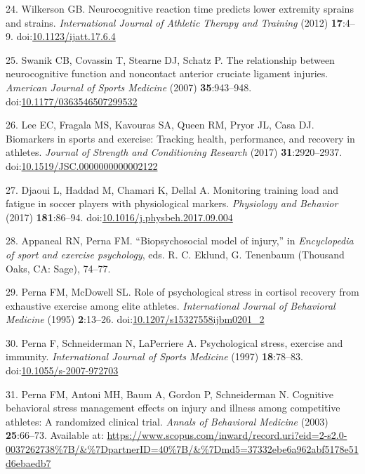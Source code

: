 \documentclass[
  english,
  man]{apa6}
\newenvironment{cslreferences}%
  {}%
  {\par}
\begin{document}
\begin{cslreferences}
\leavevmode\hypertarget{ref-Wilkerson2012a}{}%
24. Wilkerson GB. Neurocognitive reaction time predicts lower extremity sprains and strains. \emph{International Journal of Athletic Therapy and Training} (2012) \textbf{17}:4--9. doi:\href{https://doi.org/10.1123/ijatt.17.6.4}{10.1123/ijatt.17.6.4}

\leavevmode\hypertarget{ref-Swanik2007}{}%
25. Swanik CB, Covassin T, Stearne DJ, Schatz P. The relationship between neurocognitive function and noncontact anterior cruciate ligament injuries. \emph{American Journal of Sports Medicine} (2007) \textbf{35}:943--948. doi:\href{https://doi.org/10.1177/0363546507299532}{10.1177/0363546507299532}

\leavevmode\hypertarget{ref-Lee2017}{}%
26. Lee EC, Fragala MS, Kavouras SA, Queen RM, Pryor JL, Casa DJ. Biomarkers in sports and exercise: Tracking health, performance, and recovery in athletes. \emph{Journal of Strength and Conditioning Research} (2017) \textbf{31}:2920--2937. doi:\href{https://doi.org/10.1519/JSC.0000000000002122}{10.1519/JSC.0000000000002122}

\leavevmode\hypertarget{ref-Djaoui2017}{}%
27. Djaoui L, Haddad M, Chamari K, Dellal A. Monitoring training load and fatigue in soccer players with physiological markers. \emph{Physiology and Behavior} (2017) \textbf{181}:86--94. doi:\href{https://doi.org/10.1016/j.physbeh.2017.09.004}{10.1016/j.physbeh.2017.09.004}

\leavevmode\hypertarget{ref-Appaneal2014}{}%
28. Appaneal RN, Perna FM. ``Biopsychosocial model of injury,'' in \emph{Encyclopedia of sport and exercise psychology}, eds. R. C. Eklund, G. Tenenbaum (Thousand Oaks, CA: Sage), 74--77.

\leavevmode\hypertarget{ref-Perna1995}{}%
29. Perna FM, McDowell SL. Role of psychological stress in cortisol recovery from exhaustive exercise among elite athletes. \emph{International Journal of Behavioral Medicine} (1995) \textbf{2}:13--26. doi:\href{https://doi.org/10.1207/s15327558ijbm0201_2}{10.1207/s15327558ijbm0201\_2}

\leavevmode\hypertarget{ref-Perna1997}{}%
30. Perna F, Schneiderman N, LaPerriere A. Psychological stress, exercise and immunity. \emph{International Journal of Sports Medicine} (1997) \textbf{18}:78--83. doi:\href{https://doi.org/10.1055/s-2007-972703}{10.1055/s-2007-972703}

\leavevmode\hypertarget{ref-Perna2003}{}%
31. Perna FM, Antoni MH, Baum A, Gordon P, Schneiderman N. Cognitive behavioral stress management effects on injury and illness among competitive athletes: A randomized clinical trial. \emph{Annals of Behavioral Medicine} (2003) \textbf{25}:66--73. Available at: \url{https://www.scopus.com/inward/record.uri?eid=2-s2.0-0037262738\%7B/\&\%7DpartnerID=40\%7B/\&\%7Dmd5=37332ebe6a962abf5178e51d6ebaedb7}


\end{cslreferences}
\end{document}

